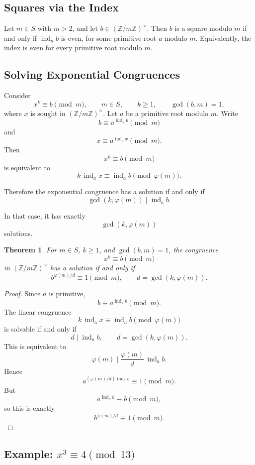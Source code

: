 \documentclass[11pt]{article}
\newtheorem{theorem}{Theorem}[section]
\theoremstyle{remark}
\DeclareMathOperator{\gcdop}{gcd}
\DeclareMathOperator{\ind}{ind}
\newcommand{\phiE}{\varphi}
\newcommand{\units}[1]{\left(\mathbb Z/#1\mathbb Z\right)^\times}
\begin{document}
\subsection{Squares via the Index}

Let $m\in S$ with $m>2$, and let $b\in\units m$. Then $b$ is a square modulo
$m$ if and only if $\ind_a b$ is even, for some primitive root $a$ modulo
$m$. Equivalently, the index is even for every primitive root modulo $m$.

\subsection{Solving Exponential Congruences}

Consider
\[
    x^k\equiv b\pmod m,
    \qquad
    m\in S,
    \qquad
    k\ge 1,
    \qquad
    \gcdop(b,m)=1,
\]
where $x$ is sought in $\units m$.
Let $a$ be a primitive root modulo $m$. Write
\[
    b\equiv a^{\ind_a b}\pmod m
\]
and
\[
    x\equiv a^{\ind_a x}\pmod m.
\]
Then
\[
    x^k\equiv b\pmod m
\]
is equivalent to
\[
    k\,\ind_a x
    \equiv
    \ind_a b
    \pmod{\phiE(m)}.
\]

Therefore the exponential congruence has a solution if and only if
\[
    \boxed{
    \gcdop\!\left(k,\phiE(m)\right)
    \mid
    \ind_a b
    }.
\]

In that case, it has exactly
\[
    \gcdop\!\left(k,\phiE(m)\right)
\]
solutions.

\begin{theorem}
For $m\in S$, $k\ge 1$, and $\gcdop(b,m)=1$, the congruence
\[
    x^k\equiv b\pmod m
\]
in $\units m$ has a solution if and only if
\[
    \boxed{
    b^{\phiE(m)/d}\equiv1\pmod m
    },
    \qquad
    d=\gcdop(k,\phiE(m)).
    \]
\end{theorem}

\begin{proof}
Since $a$ is primitive,
\[
    b\equiv a^{\ind_a b}\pmod m.
\]
The linear congruence
\[
    k\,\ind_a x
    \equiv
    \ind_a b
    \pmod{\phiE(m)}
\]
is solvable if and only if
\[
    d\mid\ind_a b,
    \qquad
    d=\gcdop(k,\phiE(m)).
\]
This is equivalent to
\[
    \phiE(m)\mid
    \frac{\phiE(m)}d\,\ind_a b.
\]
Hence
\[
    a^{(\phiE(m)/d)\ind_a b}
    \equiv1\pmod m.
\]
But
\[
    a^{\ind_a b}\equiv b\pmod m,
\]
so this is exactly
\[
    b^{\phiE(m)/d}\equiv1\pmod m.
\]
\end{proof}

\subsection{Example: $x^3\equiv4\pmod{13}$}
\end{document}
